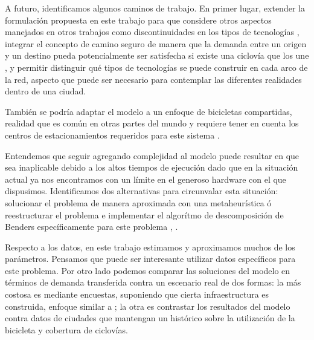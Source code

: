 A futuro, identificamos algunos caminos de trabajo. En primer lugar, extender la formulación propuesta en este trabajo para que considere otros aspectos manejados en otros trabajos como discontinuidades en los tipos de tecnologías \citep{baya2021}, integrar el concepto de camino seguro de manera que la demanda entre un origen y un destino pueda potencialmente ser satisfecha si existe una ciclovía que los une \citep{Duthie2014}, y permitir distinguir qué tipos de tecnologías se puede construir en cada arco de la red, aspecto que puede ser necesario para contemplar las diferentes realidades dentro de una ciudad.

También se podría adaptar el modelo a un enfoque de bicicletas compartidas, realidad que es común en otras partes del mundo y requiere tener en cuenta los centros de estacionamientos requeridos para este sistema \citep{vogel2016}.

Entendemos que seguir agregando complejidad al modelo puede resultar en que sea inaplicable debido a los altos tiempos de ejecución dado que en la situación actual ya nos encontramos con un límite en el generoso hardware con el que dispusimos. Identificamos dos alternativas para circunvalar esta situación: solucionar el problema de manera aproximada con una metaheurística ó reestructurar el problema e implementar el algorítmo de descomposición de Benders específicamente para este problema \citep{bucarey2022}, \citep{Crainic2021}.

Respecto a los datos, en este trabajo estimamos y aproximamos muchos de los parámetros. Pensamos que puede ser interesante utilizar datos específicos para este problema. Por otro lado podemos comparar las soluciones del modelo en términos de demanda transferida contra un escenario real de dos formas: la más costosa es mediante encuestas, suponiendo que cierta infraestructura es construida, enfoque similar a \cite{shwe2014}; la otra es contrastar los resultados del modelo contra datos de ciudades que mantengan un histórico sobre la utilización de la bicicleta y cobertura de ciclovías.
